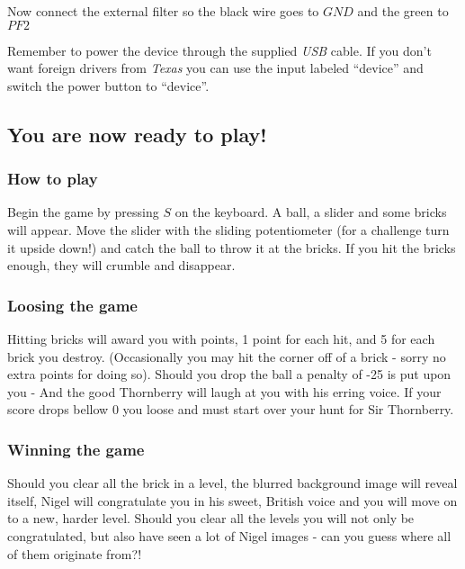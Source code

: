 Now connect the external filter so the black wire goes to $GND$ and the green to
$PF2$

Remember to power the device through the supplied \emph{USB} cable. If you don't
want foreign drivers from \emph{Texas} you can use the input labeled ``device''
and switch the power button to ``device''.

\subsection{You are now ready to play!}
\subsubsection{How to play}
Begin the game by pressing $S$ on the keyboard. A ball, a slider and some bricks
will appear. Move the slider with the sliding potentiometer (for a challenge
turn it upside down!) and catch the ball to throw it at the bricks. If you hit
the bricks enough, they will crumble and disappear.

\subsubsection{Loosing the game}
Hitting bricks will award you with points, 1 point for each hit, and 5 for
each brick you destroy. (Occasionally you may hit the corner off of a brick -
sorry no extra points for doing so). Should you drop the ball a penalty of -25
is put upon you - And the good Thornberry will laugh at you with his erring
voice. If your score drops bellow 0 you loose and must start over your hunt for
Sir Thornberry.

\subsubsection{Winning the game}
Should you clear all the brick in a level, the blurred background image will
reveal itself, Nigel will congratulate you in his sweet, British voice and you
will move on to a new, harder level.
Should you clear all the levels you will not only be congratulated, but also have seen a lot of Nigel
images - can you guess where all of them originate from?!






